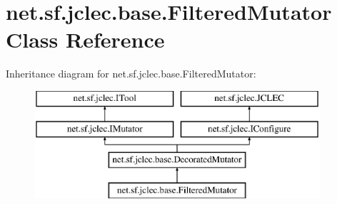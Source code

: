 \hypertarget{classnet_1_1sf_1_1jclec_1_1base_1_1_filtered_mutator}{\section{net.\-sf.\-jclec.\-base.\-Filtered\-Mutator Class Reference}
\label{classnet_1_1sf_1_1jclec_1_1base_1_1_filtered_mutator}
}
Inheritance diagram for net.\-sf.\-jclec.\-base.\-Filtered\-Mutator\-:\begin{figure}[H]
\begin{center}
\leavevmode
\includegraphics[height=4.000000cm]{classnet_1_1sf_1_1jclec_1_1base_1_1_filtered_mutator}
\end{center}
\end{figure}
